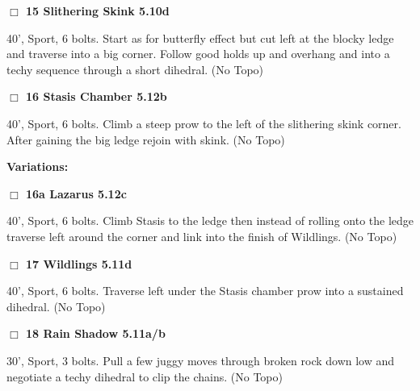 \begin{multicols}{2}
\needspace{1.5cm}
\label{rt:Slithering Skink}
\colorbox{RoyalBlue!20}{
\parbox{0.95\linewidth}{
\hspace{-1ex}\textbf{$\Box$
15 Slithering Skink 5.10d  
}}}
\begin{adjustwidth}{1.3em}{}			
40', Sport, 6 bolts. Start as for butterfly effect but cut left at the blocky ledge and traverse into a big corner. Follow good holds up and overhang and into a techy sequence through a short dihedral.
  (No Topo)
\end{adjustwidth}




\needspace{1.5cm}
\label{rt:Stasis Chamber}
\colorbox{Goldenrod!20}{
\parbox{0.95\linewidth}{
\hspace{-1ex}\textbf{$\Box$
16 Stasis Chamber 5.12b  
}}}
\begin{adjustwidth}{1.3em}{}			
40', Sport, 6 bolts. Climb a steep prow to the left of the slithering skink corner. After gaining the big ledge rejoin with skink.
  (No Topo)
\end{adjustwidth}


\begin{adjustwidth}{0.5cm}{}				
\needspace{3cm}
\textbf{Variations:} \newline

\needspace{1.5cm}
\label{vr:Lazarus}
\colorbox{Goldenrod!20}{
\parbox{0.95\linewidth}{
\hspace{-1ex}\textbf{$\Box$
16a Lazarus 5.12c  
}}}
\begin{adjustwidth}{1.3em}{}			
40', Sport, 6 bolts. Climb Stasis to the ledge then instead of rolling onto the ledge traverse left around the corner and link into the finish of Wildlings.
  (No Topo)
\end{adjustwidth}



\end{adjustwidth}


\needspace{1.5cm}
\label{rt:Wildlings}
\colorbox{RoyalBlue!20}{
\parbox{0.95\linewidth}{
\hspace{-1ex}\textbf{$\Box$
17 Wildlings 5.11d  
}}}
\begin{adjustwidth}{1.3em}{}			
40', Sport, 6 bolts. Traverse left under the Stasis chamber prow into a sustained dihedral.
  (No Topo)
\end{adjustwidth}




\needspace{1.5cm}
\label{rt:Rain Shadow}
\colorbox{RoyalBlue!20}{
\parbox{0.95\linewidth}{
\hspace{-1ex}\textbf{$\Box$
18 Rain Shadow 5.11a/b  
}}}
\begin{adjustwidth}{1.3em}{}			
30', Sport, 3 bolts. Pull a few juggy moves through broken rock down low and negotiate a techy dihedral to clip the chains.
  (No Topo)
\end{adjustwidth}





\end{multicols}

